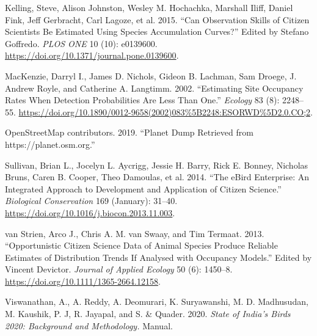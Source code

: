 \documentclass[
]{article}
\begin{document}
\leavevmode\hypertarget{ref-kelling2015a}{}%
Kelling, Steve, Alison Johnston, Wesley M. Hochachka, Marshall Iliff, Daniel Fink, Jeff Gerbracht, Carl Lagoze, et al. 2015. ``Can Observation Skills of Citizen Scientists Be Estimated Using Species Accumulation Curves?'' Edited by Stefano Goffredo. \emph{PLOS ONE} 10 (10): e0139600. \url{https://doi.org/10.1371/journal.pone.0139600}.

\leavevmode\hypertarget{ref-mackenzie2002}{}%
MacKenzie, Darryl I., James D. Nichols, Gideon B. Lachman, Sam Droege, J. Andrew Royle, and Catherine A. Langtimm. 2002. ``Estimating Site Occupancy Rates When Detection Probabilities Are Less Than One.'' \emph{Ecology} 83 (8): 2248--55. \url{https://doi.org/10.1890/0012-9658(2002)083\%5B2248:ESORWD\%5D2.0.CO;2}.

\leavevmode\hypertarget{ref-OpenStreetMap}{}%
OpenStreetMap contributors. 2019. ``Planet Dump Retrieved from https://planet.osm.org.''

\leavevmode\hypertarget{ref-sullivan2014}{}%
Sullivan, Brian L., Jocelyn L. Aycrigg, Jessie H. Barry, Rick E. Bonney, Nicholas Bruns, Caren B. Cooper, Theo Damoulas, et al. 2014. ``The eBird Enterprise: An Integrated Approach to Development and Application of Citizen Science.'' \emph{Biological Conservation} 169 (January): 31--40. \url{https://doi.org/10.1016/j.biocon.2013.11.003}.

\leavevmode\hypertarget{ref-vanstrien2013}{}%
van Strien, Arco J., Chris A. M. van Swaay, and Tim Termaat. 2013. ``Opportunistic Citizen Science Data of Animal Species Produce Reliable Estimates of Distribution Trends If Analysed with Occupancy Models.'' Edited by Vincent Devictor. \emph{Journal of Applied Ecology} 50 (6): 1450--8. \url{https://doi.org/10.1111/1365-2664.12158}.

\leavevmode\hypertarget{ref-viswanathan2020}{}%
Viswanathan, A., A. Reddy, A. Deomurari, K. Suryawanshi, M. D. Madhusudan, M. Kaushik, P. J, R. Jayapal, and S. \& Quader. 2020. \emph{State of India's Birds 2020: Background and Methodology.} Manual.
\end{document}
